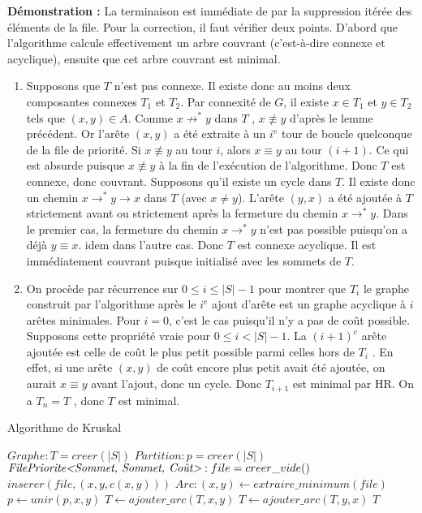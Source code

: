 \documentclass[../../../main.tex]{subfiles}
\begin{document}
\textbf{Démonstration :} La terminaison est immédiate de par la suppression itérée des éléments de la file.
Pour la correction, il faut vérifier deux points. D'abord que l'algorithme calcule effectivement un arbre
couvrant (c'est-à-dire connexe et acyclique), ensuite que cet arbre couvrant est minimal.
\begin{enumerate}
	\item Supposons que $T$ n'est pas connexe. Il existe donc au moins deux composantes connexes $T_1$ et $T_2$.
	Par connexité de $G$, il existe $x\in T_1$ et $y\in T_2$ tels que $(x, y)\in A$. Comme $x\not\rightarrow^* y$ dans $T$ , $x\not\equiv y$
d'après le lemme précédent. Or l'arête $(x, y)$ a été extraite à un $i^e$ tour de boucle quelconque de
la file de priorité. Si $x\not\equiv y$ au tour $i$, alors $x\equiv y$ au tour $(i+1)$. Ce qui est absurde puisque
$x\not\equiv y$ à la fin de l'exécution de l'algorithme. Donc $T$ est connexe, donc couvrant. \newline
Supposons qu'il existe un cycle dans $T$. Il existe donc un chemin $x\rightarrow^*y \rightarrow x$ dans $T$ (avec $x\neq y$). L'arête $(y, x)$ a été ajoutée à $T$ strictement avant ou strictement après la fermeture du
chemin $x\rightarrow^*y$. Dans le premier cas, la fermeture du chemin $x\rightarrow^*y$ n'est pas possible puisqu'on
a déjà $y\equiv x$. idem dans l'autre cas. \newline
Donc $T$ est connexe acyclique. Il est immédiatement couvrant puisque initialisé avec les sommets
de $T$.
	\item On procède par récurrence sur $0 \leq i \leq |S| - 1$ pour montrer que $T_i$ le graphe construit par
l'algorithme après le $i^e$ ajout d'arête est un graphe acyclique à $i$ arêtes minimales. Pour $i = 0$, c'est
le cas puisqu'il n'y a pas de coût possible. Supposons cette propriété vraie pour $0\leq i < |S| - 1$.
La $(i + 1)^e$ arête ajoutée est celle de coût le plus petit possible parmi celles hors de $T_i$ . En effet,
si une arête $(x, y)$ de coût encore plus petit avait été ajoutée, on aurait $x\equiv y$ avant l'ajout, donc
un cycle. Donc $T_{i+1}$ est minimal par HR. On a $T_n = T$ , donc $T$ est minimal.
\end{enumerate}
\begin{algorithm}
\caption{Algorithme de Kruskal\label{alg:kruskal}}
$Graphe:T = creer(|S|)$
$Partition:p = creer(|S|)$\;
$\textit{FilePriorite\textless Sommet, Sommet, Coût\textgreater}:file = creer\_vide()$
 {
	 {
		$inserer(file, (x, y, c(x, y)))$\;
	}
}
 {
	$Arc:(x, y)\leftarrow extraire\_minimum(file)$
	 {
		$p\leftarrow unir(p, x, y)$\;
		$T\leftarrow ajouter\_arc(T, x, y)$\;
		$T\leftarrow ajouter\_arc(T, y, x)$\;
	}
}
\Return $T$\;
\end{algorithm}
\end{document}

